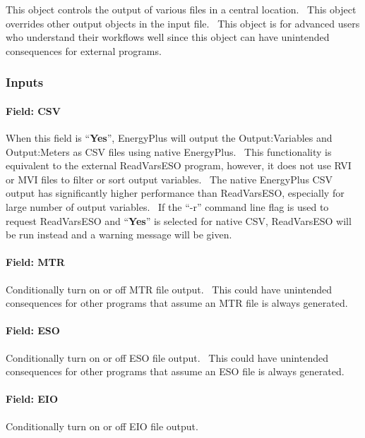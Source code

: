 This object controls the output of various files in a central location.~ This object overrides other output objects in the input file.~ This object is for advanced users who understand their workflows well since this object can have unintended consequences for external programs.

\subsubsection{Inputs}\label{outputcontrolfiles-inputs}

\paragraph{Field: CSV}\label{field-csv}

When this field is ``\textbf{Yes}'', EnergyPlus will output the Output:Variables and Output:Meters as CSV files using native EnergyPlus.~ This functionality is equivalent to the external ReadVarsESO program, however, it does not use RVI or MVI files to filter or sort output variables.~ The native EnergyPlus CSV output has significantly higher performance than ReadVarsESO, especially for large number of output variables.~ If the ``-r'' command line flag is used to request ReadVarsESO and ``\textbf{Yes}'' is selected for native CSV, ReadVarsESO will be run instead and a warning message will be given.

\paragraph{Field: MTR}\label{field-mtr}

Conditionally turn on or off MTR file output.~ This could have unintended consequences for other programs that assume an MTR file is always generated.

\paragraph{Field: ESO}\label{field-eso}

Conditionally turn on or off ESO file output.~ This could have unintended consequences for other programs that assume an ESO file is always generated.

\paragraph{Field: EIO}\label{field-eio}

Conditionally turn on or off EIO file output.

